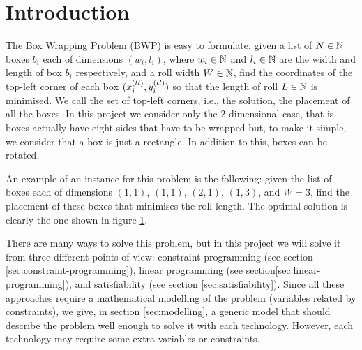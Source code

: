 \section{Introduction}
\label{sec:introduction}

The Box Wrapping Problem (BWP) is easy to formulate: given a list of $N \in \mathbb{N}$ boxes
$b_i$ each of dimensions $(w_i, l_i)$, where $w_i \in \mathbb{N}$ and $l_i \in \mathbb{N}$
are the width and length of box $b_i$ respectively, and a roll width $W \in \mathbb{N}$,
find the coordinates of  the top-left corner of each box $(\Xtl[i], \Ytl[i])$ so that
the length of roll $L \in \mathbb{N}$ is minimised. We call the set of top-left corners, i.e.,
the solution, the placement of all the boxes. In this project we consider only the
2-dimensional case, that is, boxes actually have eight sides that have to be wrapped but,
to make it simple, we consider that a box is just a rectangle. In addition to this, boxes
can be rotated.

\hfill

An example of an instance for this problem is the following: given the list of boxes each
of dimensions $(1,1)$, $(1,1)$, $(2,1)$, $(1,3)$, and $W=3$, find the placement of these
boxes that minimises the roll length. The optimal solution is clearly the one shown
in figure \ref{fig:example-placement}.

\begin{figure}[H]
	\centering
    {}
	\label{fig:example-placement}
\end{figure}

There are many ways to solve this problem, but in this project we will solve it from
three different points of view: constraint programming (see section \ref{sec:constraint-programming}),
linear programming (see section\ref{sec:linear-programming}), and satisfiability (see
section \ref{sec:satisfiability}). Since all these approaches require a mathematical modelling
of the problem (variables related by constraints), we give, in section \ref{sec:modelling},
a generic model that should describe the problem well enough to solve it with each technology.
However, each technology may require some extra variables or constraints.